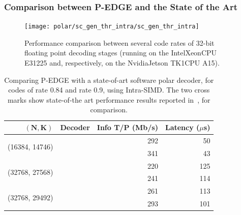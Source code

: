 \subsubsection{Comparison between P-EDGE and the State of the Art}

\begin{figure}
  \texttt{[image: polar/sc\_gen\_thr\_intra/sc\_gen\_thr\_intra]}
  \caption{Performance comparison between several code rates of 32-bit floating
    point decoding stages (running on the Intel\R Xeon\TM CPU E31225 and,
    respectively, on the Nvidia\R Jetson TK1\TM CPU A15).}
  \label{plot:eval_polar_sc_gen_thr_intra}
\end{figure}

\begin{table}
  \begin{center}
  \begin{tabular}{r  r  r  r}
    $\bm{(N, K)}$                   & \textbf{Decoder}     & \textbf{Info T/P} (Mb/s) & \textbf{Latency} ($\mu$s)\\
    \hline
    \hline
    \multirow{2}{*}{(16384, 14746)} & \cite{Sarkis2014}    & 292                      & 50              \\
                                    & \cite{Cassagne2015c} & 341                      & 43              \\
    \hline
    \multirow{2}{*}{(32768, 27568)} & \cite{Sarkis2014}    & 220                      & 125             \\
                                    & \cite{Cassagne2015c} & 241                      & 114             \\
    \hline
    \multirow{2}{*}{(32768, 29492)} & \cite{Sarkis2014}    & 261                      & 113             \\
                                    & \cite{Cassagne2015c} & 293                      & 101             \\
  \end{tabular}
  \end{center}
  \caption{Comparing P-EDGE with a state-of-art software polar decoder, for
    codes of rate 0.84 and rate 0.9, using Intra-SIMD. The two cross marks show
    state-of-the art performance results reported in~\cite{Sarkis2014}, for
    comparison.}
  \label{tab:eval_polar_sc_gen_thr_comparison}
\end{table}

